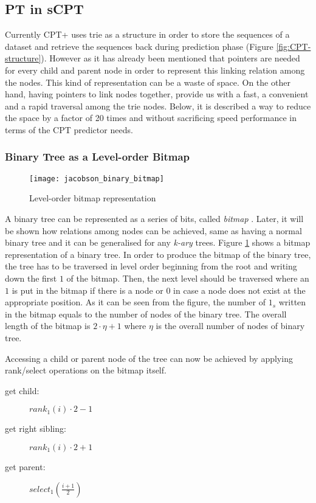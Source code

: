\subsection{PT in sCPT}
Currently CPT+ uses trie as a structure in order to store the sequences of a dataset and retrieve the sequences back during prediction phase (Figure \ref{fig:CPT-structure}). However as it has already been mentioned that pointers are needed for every child and parent node in order to represent this linking relation among the nodes. This kind of representation can be a waste of space. On the other hand, having pointers to link nodes together, provide us with a fast, a convenient and a rapid traversal among the trie nodes. Below, it is described a way to reduce the space by a factor of 20 times  and without sacrificing speed performance in terms of the CPT predictor needs.
\subsubsection*{Binary Tree as a Level-order Bitmap}

\begin{figure}
	 \centering
    \texttt{[image: jacobson\_binary\_bitmap]}
    \caption{Level-order bitmap representation}
    \label{fig:binary_bm}
\end{figure}

A binary tree can be represented as a series of bits, called \emph{bitmap} \cite{jacobson_space-efficient_1989} . Later, it will be shown how relations among nodes can be achieved, same as having a normal binary tree and it can be generalised for any \emph{k-ary} trees. Figure \ref{fig:binary_bm} shows a bitmap representation of a binary tree. In order to produce the bitmap of the binary tree, the tree has to be traversed in level order beginning from the root and writing down the first $1$ of the bitmap. Then, the next level should be traversed where an $1$ is put in the bitmap if there is a node or $0$ in case a node does not exist at the appropriate position. As it can be seen from the figure, the number of $1_s$ written in the bitmap equals to the number of nodes of the binary tree. The overall length of the bitmap is $2 \cdot \eta  + 1$ where $\eta$ is the overall number of nodes of binary tree.
\par Accessing a child or parent node of the tree can now be achieved by applying rank/select operations on the bitmap itself. 
\begin{description}
	\item [get child:] \(rank_1(i) \cdot 2 - 1\)
	\item [get right sibling:] \(rank_1(i) \cdot 2 + 1\)
	\item [get parent:] \(select_1(\frac{i + 1}{2} )\)
\end{description}

